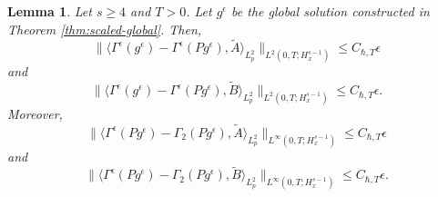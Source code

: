 \documentclass[10pt,reqno]{amsart}
\numberwithin{equation}{section}
\newtheorem{lemma}{Lemma}[section]
\newcommand{\lal}{\langle}
\newcommand{\ral}{\rangle}
\newcommand{\bq}{\begin{equation}}
\newcommand{\eq}{\end{equation}}
\begin{document}
\begin{lemma}\label{lem:nl-rem}
Let $s\ge4$ and $T>0$. Let $g^\epsilon$ be the global solution constructed in Theorem \ref{thm:scaled-global}. Then,
\bq\label{eq:Gam-micro-A}
\| \lal \Gamma^\epsilon ( g^\epsilon ) - \Gamma^\epsilon ( P g^\epsilon ), \widetilde A  \ral_{L^2_p} \|_{L^2(0,T;H^{s-1}_x)} \le C_{\hbar,T} \epsilon
\eq
and
\bq\label{eq:Gam-micro-B}
\| \lal \Gamma^\epsilon ( g^\epsilon ) - \Gamma^\epsilon ( P g^\epsilon ), \widetilde B  \ral_{L^2_p} \|_{L^2(0,T;H^{s-1}_x)} \le C_{\hbar,T} \epsilon.
\eq
Moreover,
\bq\label{eq:Gam-high-A}
\| \lal \Gamma^\epsilon ( P g^\epsilon ) - \Gamma_2  ( P g^\epsilon ), \widetilde A  \ral_{L^2_p} \|_{L^\infty(0,T;H^{s-1}_x)} \le C_{\hbar,T} \epsilon
\eq
and
\bq\label{eq:Gam-high-B}
\| \lal \Gamma^\epsilon ( P g^\epsilon ) - \Gamma_2  ( P g^\epsilon ), \widetilde B  \ral_{L^2_p} \|_{L^\infty(0,T;H^{s-1}_x)} \le C_{\hbar,T} \epsilon.
\eq
\end{lemma}
\end{document}
